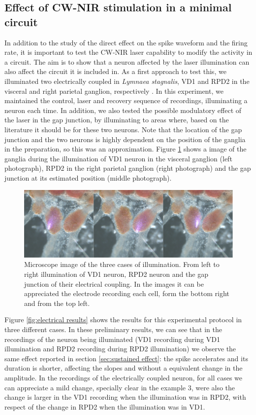\subsection{Effect of CW-NIR stimulation in a minimal circuit}
\label{subsec:electrical}
In addition to the study of the direct effect on the spike waveform and the firing rate, it is important to test the CW-NIR laser capability to modify the activity in a circuit. The aim is to show that a neuron affected by the laser illumination can also affect the circuit it is included in. As a first approach to test this, we illuminated two  electrically coupled  in \textit{Lymnaea stagnalis}, VD1 and RPD2 in the visceral and right parietal ganglion, respectively \parencite{benjamin_electrotonic_1986,beekharry_role_2015}. In this experiment, we maintained the control, laser and recovery sequence of recordings, illuminating a neuron each time. In addition, we also tested the possible modulatory effect of the laser in the gap junction, by illuminating to areas where, based on the literature it should be for these two neurons. Note that the location of the gap junction and the two neurons is highly dependent on the position of the ganglia in the preparation, so this was an approximation. Figure \ref{fig:electrical images} shows a image of the ganglia during the illumination of VD1 neuron in the visceral ganglion (left photograph), RPD2 in the right parietal ganglion (right photograph) and the gap junction at its estimated position (middle photograph).
\begin{figure}[hbt!]
    \centering
    \includegraphics[width=\textwidth]{img/laser/electrical/image1.png}
    \caption{Microscope image of the three cases of illumination. From left to right illumination of VD1 neuron, RPD2 neuron and the gap junction of their electrical coupling. In the images it can be appreciated the electrode recording each cell, form the bottom right and from the top left.}
    \label{fig:electrical images}
\end{figure}
Figure \ref{fig:electrical results} shows the results for this experimental protocol in three different cases. In these preliminary results, we can see that in the recordings of the neuron being illuminated (VD1 recording during VD1 illumination and RPD2 recording during RPD2 illumination) we observe the same effect reported in section \ref{sec:sustained effect}: the spike accelerates and its duration is shorter, affecting the slopes and without a equivalent change in the amplitude. In the recordings of the electrically coupled neuron, for all cases we can appreciate a mild change, specially clear in the example 3, were also the change is larger in the VD1 recording when the illumination was in RPD2, with respect of the change in RPD2 when the illumination was in VD1. 

